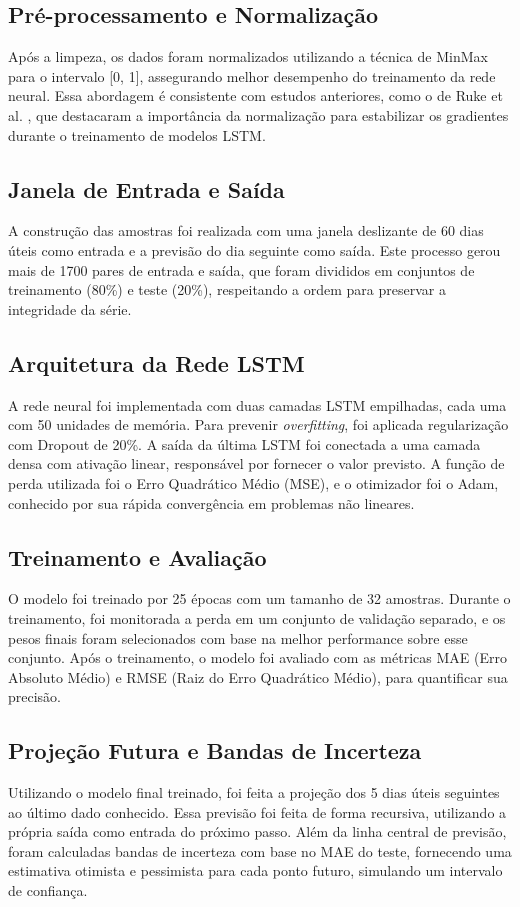 \documentclass[conference]{IEEEtran}
\begin{document}
\subsection{Pré-processamento e Normalização}
Após a limpeza, os dados foram normalizados utilizando a técnica de MinMax para o intervalo [0, 1], assegurando melhor desempenho do treinamento da rede neural. Essa abordagem é consistente com estudos anteriores, como o de Ruke et al. \cite{b3}, que destacaram a importância da normalização para estabilizar os gradientes durante o treinamento de modelos LSTM.

\subsection{Janela de Entrada e Saída}
A construção das amostras foi realizada com uma janela deslizante de 60 dias úteis como entrada e a previsão do dia seguinte como saída. Este processo gerou mais de 1700 pares de entrada e saída, que foram divididos em conjuntos de treinamento (80\%) e teste (20\%), respeitando a ordem para preservar a integridade da série.

\subsection{Arquitetura da Rede LSTM}
A rede neural foi implementada com duas camadas LSTM empilhadas, cada uma com 50 unidades de memória. Para prevenir \textit{overfitting}, foi aplicada regularização com Dropout de 20\%. A saída da última LSTM foi conectada a uma camada densa com ativação linear, responsável por fornecer o valor previsto. A função de perda utilizada foi o Erro Quadrático Médio (MSE), e o otimizador foi o Adam, conhecido por sua rápida convergência em problemas não lineares.

\subsection{Treinamento e Avaliação}
O modelo foi treinado por 25 épocas com um tamanho de 32 amostras. Durante o treinamento, foi monitorada a perda em um conjunto de validação separado, e os pesos finais foram selecionados com base na melhor performance sobre esse conjunto. Após o treinamento, o modelo foi avaliado com as métricas MAE (Erro Absoluto Médio) e RMSE (Raiz do Erro Quadrático Médio), para quantificar sua precisão.

\subsection{Projeção Futura e Bandas de Incerteza}
Utilizando o modelo final treinado, foi feita a projeção dos 5 dias úteis seguintes ao último dado conhecido. Essa previsão foi feita de forma recursiva, utilizando a própria saída como entrada do próximo passo. Além da linha central de previsão, foram calculadas bandas de incerteza com base no MAE do teste, fornecendo uma estimativa otimista e pessimista para cada ponto futuro, simulando um intervalo de confiança.
\end{document}
